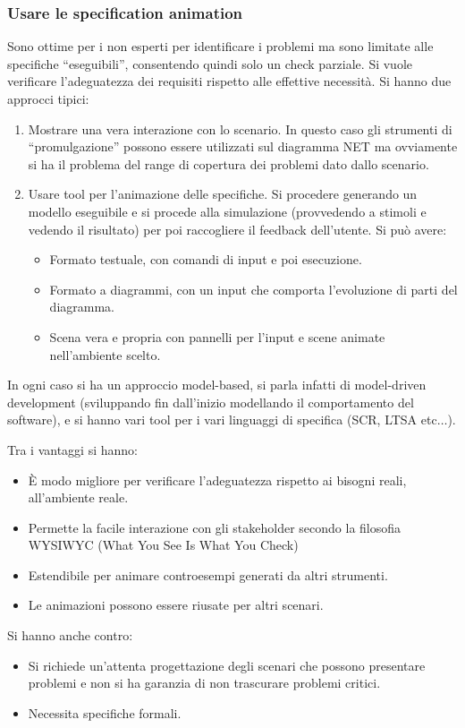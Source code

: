 \subsubsection{Usare le specification animation}
Sono ottime per i non esperti per identificare i problemi ma sono limitate alle
specifiche “eseguibili”, consentendo quindi solo un check parziale. Si vuole
verificare l'adeguatezza dei requisiti rispetto alle effettive necessità. Si
hanno due approcci tipici:
\begin{enumerate}
      \item Mostrare una vera interazione con lo scenario. In questo caso gli
            strumenti di “promulgazione” possono essere utilizzati sul diagramma
            NET ma ovviamente si ha il problema del range di copertura dei
            problemi dato dallo scenario.
      \item Usare tool per l'animazione delle specifiche. Si procedere generando
            un modello eseguibile e si procede alla simulazione (provvedendo a
            stimoli e vedendo il risultato) per poi raccogliere il feedback
            dell'utente. Si può avere:
            \begin{itemize}
                  \item Formato testuale, con comandi di input e poi esecuzione.
                  \item Formato a diagrammi, con un input che comporta l'evoluzione
                        di parti del diagramma.
                  \item Scena vera e propria con pannelli per l'input e scene animate
                        nell'ambiente scelto.
            \end{itemize}
\end{enumerate}
In ogni caso si ha un approccio model-based, si parla infatti di model-driven
development (sviluppando fin dall'inizio modellando il comportamento del software),
e si hanno vari tool per i vari linguaggi di specifica (SCR, LTSA etc$\dots$).

Tra i vantaggi si hanno:
\begin{itemize}
      \item È modo migliore per verificare l'adeguatezza rispetto ai bisogni reali,
            all'ambiente reale.
      \item Permette la facile interazione con gli stakeholder secondo la filosofia
            WYSIWYC (What You See Is What You Check)
      \item Estendibile per animare controesempi generati da altri strumenti.
      \item Le animazioni possono essere riusate per altri scenari.
\end{itemize}
Si hanno anche contro:
\begin{itemize}
      \item Si richiede un'attenta progettazione degli scenari che possono presentare
            problemi e non si ha garanzia di non trascurare problemi critici.
      \item Necessita specifiche formali.
\end{itemize}
